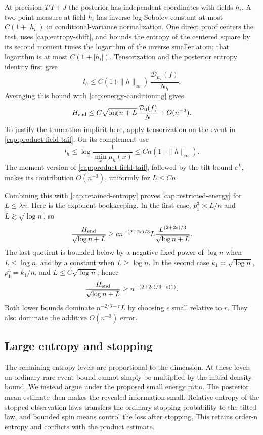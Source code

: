 At precision $T'I+J$ the posterior has independent coordinates with fields
$h_i$. A two-point measure at field $h_i$ has inverse log-Sobolev constant at
most $C(1+|h_i|)$ in conditional-variance normalization. One direct proof
centers the test, uses \eqref{cap:entropy-shift}, and bounds the entropy of
the centered square by its second moment times the logarithm of the inverse
smaller atom; that logarithm is at most $C(1+|h_i|)$. Tensorization and
the posterior entropy identity first give
\[
 l_h\le C(1+\|h\|_\infty)\,
       \frac{\mathcal D_{\mu_h}(f)}{N_h}.
\]
Averaging this bound with \eqref{cap:energy-conditioning} gives
\begin{equation}\label{cap:product-entropy-bound}
 H_{\rm end}\le
 C\sqrt{\log n+L}\,\frac{\mathcal D_0(f)}N+O(n^{-3}).
\end{equation}
To justify the truncation implicit here, apply tensorization on the
event in \eqref{cap:product-field-tail}.  On its complement use
\[
 l_h\le\log\frac1{\min_x\mu_h(x)}
       \le Cn(1+\|h\|_\infty).
\]
The moment version of \eqref{cap:product-field-tail}, followed by the
tilt bound $e^L$, makes its contribution $O(n^{-3})$, uniformly for
$L\le Cn$.

Combining this with \eqref{cap:retained-entropy} proves
\eqref{cap:restricted-energy} for $L\le\lambda n$. Here is the exponent
bookkeeping. In the first case, $p_1^3\asymp L/n$ and $L\gtrsim\sqrt{\log n}$,
so
\[
 \frac{H_{\rm end}}{\sqrt{\log n+L}}
 \ge c n^{-(2+2\epsilon)/3}L
          \frac{L^{(2+2\epsilon)/3}}{\sqrt{\log n+L}}.
\]
The last quotient is bounded below by a negative fixed power of $\log n$ when
$L\le\log n$, and by a constant when $L\ge\log n$. In the second case
$k_1\asymp\sqrt{\log n}$, $p_1^3=k_1/n$, and $L\le C\sqrt{\log n}$; hence
\[
 \frac{H_{\rm end}}{\sqrt{\log n+L}}
 \ge n^{-(2+2\epsilon)/3-o(1)}.
\]
Both lower bounds dominate $n^{-2/3-r}L$ by choosing $\epsilon$ small
relative to $r$.  They also dominate the additive $O(n^{-3})$ error.

\subsection{Large entropy and stopping}\label{cap:large-entropy}

The remaining entropy levels are proportional to the dimension. At these
levels an ordinary rare-event bound cannot simply be multiplied by the initial
density bound. We instead argue under the proposed small energy ratio. The
posterior mean estimate then makes the revealed information small. Relative
entropy of the stopped observation laws transfers the ordinary stopping
probability to the tilted law, and bounded spin means control the loss after
stopping. This retains order-n entropy and conflicts with the product
estimate.

